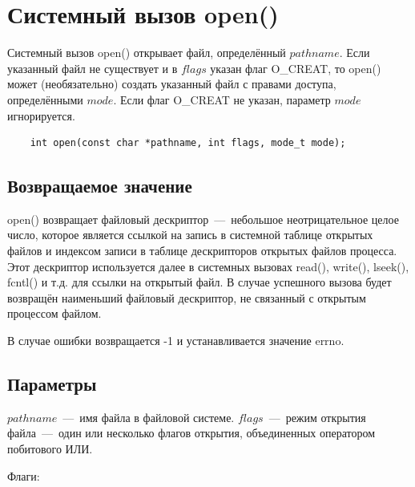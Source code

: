 \chapter{Системный вызов open()} 


Системный вызов open() открывает файл, определённый $pathname$. Если указанный файл не существует и в $flags$ указан флаг O\_CREAT, то open() может (необязательно) создать указанный файл с правами доступа, определёнными $mode$. Если флаг O\_CREAT не указан, параметр $mode$ игнорируется.

\begin{lstlisting}
	int open(const char *pathname, int flags, mode_t mode);
\end{lstlisting}

\section{Возвращаемое значение}

open() возвращает файловый дескриптор~---~небольшое неотрицательное целое число, которое является ссылкой на запись в системной таблице открытых файлов и индексом записи в таблице дескрипторов открытых файлов процесса. Этот дескриптор используется далее в системных вызовах read(), write(), lseek(), fcntl() и т.д. для ссылки на открытый файл. В случае успешного вызова будет возвращён наименьший файловый дескриптор, не связанный с открытым процессом файлом.

В случае ошибки возвращается -1 и устанавливается значение errno.

\section{Параметры}

$pathname$~---~имя файла в файловой системе. $flags$~---~режим открытия файла~---~один или несколько флагов открытия, объединенных оператором побитового ИЛИ. 

Флаги:

